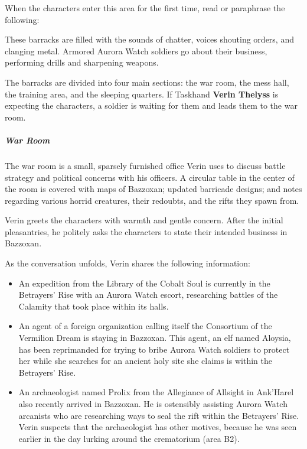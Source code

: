 \documentclass[10pt,a4paper,twoside,fancy,bg=print,twocolumn,openany,nodeprecatedcode]{dndbook}
\begin{document}
When the characters enter this area for the first time, read or paraphrase the following:

\begin{DndReadAloud}{}
These barracks are filled with the sounds of chatter, voices shouting orders, and clanging metal. Armored Aurora Watch soldiers go about their business, performing drills and sharpening weapons.

\end{DndReadAloud}

The barracks are divided into four main sections: the war room, the mess hall, the training area, and the sleeping quarters. If Taskhand \textbf{Verin Thelyss} is expecting the characters, a soldier is waiting for them and leads them to the war room.

\subparagraph{War Room}
The war room is a small, sparsely furnished office Verin uses to discuss battle strategy and political concerns with his officers. A circular table in the center of the room is covered with maps of Bazzoxan; updated barricade designs; and notes regarding various horrid creatures, their redoubts, and the rifts they spawn from.

Verin greets the characters with warmth and gentle concern. After the initial pleasantries, he politely asks the characters to state their intended business in Bazzoxan.

As the conversation unfolds, Verin shares the following information:


\begin{itemize}
\item An expedition from the Library of the Cobalt Soul is currently in the Betrayers' Rise with an Aurora Watch escort, researching battles of the Calamity that took place within its halls.
\item An agent of a foreign organization calling itself the Consortium of the Vermilion Dream is staying in Bazzoxan. This agent, an elf named Aloysia, has been reprimanded for trying to bribe Aurora Watch soldiers to protect her while she searches for an ancient holy site she claims is within the Betrayers' Rise.
\item An archaeologist named Prolix from the Allegiance of Allsight in Ank'Harel also recently arrived in Bazzoxan. He is ostensibly assisting Aurora Watch arcanists who are researching ways to seal the rift within the Betrayers' Rise. Verin suspects that the archaeologist has other motives, because he was seen earlier in the day lurking around the crematorium (area B2).
\end{itemize}
\end{document}
